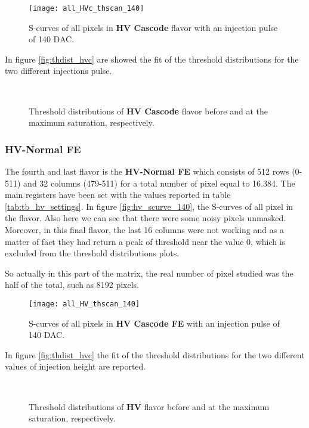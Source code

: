 \begin{figure}[h!]
\centering
\texttt{[image: all\_HVc\_thscan\_140]}
\caption{S-curves of all pixels in \textbf{HV Cascode} flavor with an injection pulse of 140 DAC.}
\label{fig:hvc_scurve_140}
\end{figure}

In figure \vref{fig:thdist_hvc} are showed the fit of the threshold distributions for the two different injections pulse.

\begin{figure}[h!]
\centering
{}\quad
{}\\
\caption{Threshold distributions of \textbf{HV Cascode} flavor before and at the maximum saturation, respectively.}
\label{fig:thdist_hvc}
\end{figure}


\subsubsection{HV-Normal FE}

The fourth and last flavor is the \textbf{HV-Normal FE} which consists of 512 rows (0-511) and 32 columns (479-511) for a total number of pixel equal to 16.384. The main registers have been set with the values reported in table \vref{tab:tb_hv_settings}.
In figure \vref{fig:hv_scurve_140}, the S-curves of all pixel in the flavor. Also here we can see that there were some noisy pixels unmasked.
Moreover, in this final flavor, the last 16 columns were not working and as a matter of fact they had return a peak of threshold near the value 0, which is excluded from the threshold distributions plots.

So actually in this part of the matrix, the real number of pixel studied was the half of the total, such as 8192 pixels.



\begin{figure}[h!]
\centering
\texttt{[image: all\_HV\_thscan\_140]}
\caption{S-curves of all pixels in \textbf{HV Cascode FE} with an injection pulse of 140 DAC.}
\label{fig:hv_scurve_140}
\end{figure}

In figure \vref{fig:thdist_hvc} the fit of the threshold distributions for the two different values of injection height are reported.


\begin{figure}[h!]
\centering
{}\quad
{}\\
\caption{Threshold distributions of \textbf{HV} flavor before and at the maximum saturation, respectively.}
\label{fig:thdist_hvc}
\end{figure}




